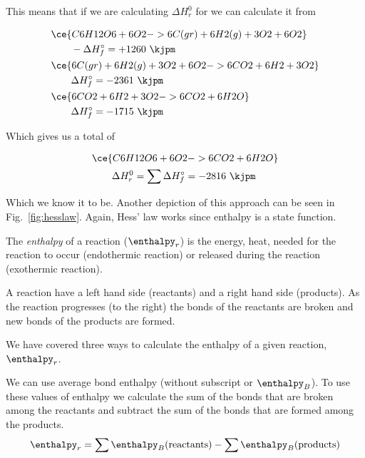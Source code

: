 \documentclass[../mit-general-chemistry.tex]{subfiles}
\begin{document}
This means that if we are calculating $\Delta H_r^0$ for
we can calculate it from

\begin{align*}
  &\ce{C6H12O6 + 6O2 -> 6C(gr) + 6H2(g) + 3O2 + 6O2} \\
  &\qquad-\Delta H_f^{\circ} = +1260~\kjpm \\
  &\ce{6C(gr) + 6H2(g) + 3O2 + 6O2 -> 6CO2 + 6H2 + 3O2} \\
  &\qquad\Delta H_f^{\circ} = -2361~\kjpm \\
  &\ce{6CO2 + 6H2 + 3O2 -> 6CO2 + 6H2O} \\
  &\qquad\Delta H_f^{\circ} = -1715~\kjpm \\
\end{align*}

Which gives us a total of

\begin{align*}
  &\ce{C6H12O6 + 6O2 -> 6CO2 + 6H2O} \\
  &\qquad\Delta H_r^0 = \sum\Delta H_f^{\circ} = -2816~\kjpm \\
\end{align*}

Which we know it to be. Another depiction of this approach can be seen
in Fig.~\ref{fig:hesslaw}. Again, Hess' law works since enthalpy is a
state function.





The {\em enthalpy} of a reaction ($\enthalpy_r$) is the energy, heat,
needed for the reaction to occur (endothermic reaction) or released
during the reaction (exothermic reaction).

A reaction have a left hand side (reactants) and a right hand side
(products). As the reaction progresses (to the right) the bonds of the
reactants are broken and new bonds of the products are formed.

We have covered three ways to calculate the enthalpy of a given
reaction, $\enthalpy_r$.

We can use average bond enthalpy (\enthalpy without subscript or
$\enthalpy_B$). To use these values of enthalpy we calculate the sum
of the bonds that are broken among the reactants and subtract the sum
of the bonds that are formed among the products.
\begin{equation}\label{eq:sum:bondenthalpy}
  \enthalpy_r = \sum \enthalpy_B(\text{reactants}) - \sum \enthalpy_B(\text{products})
\end{equation}
\end{document}

